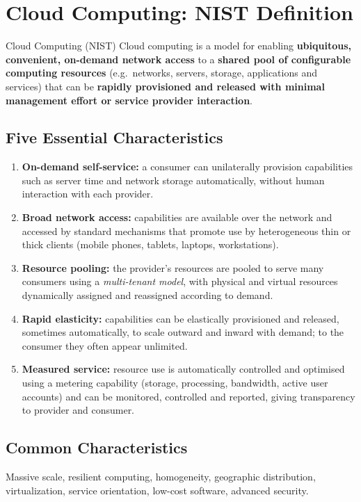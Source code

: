 \documentclass[11pt,a4paper,openany]{report}
\begin{document}
\section{Cloud Computing: NIST Definition}
\begin{defbox}{Cloud Computing (NIST)}
Cloud computing is a model for enabling \textbf{ubiquitous, convenient, on-demand network access}
to a \textbf{shared pool of configurable computing resources} (e.g.\ networks, servers, storage,
applications and services) that can be \textbf{rapidly provisioned and released with minimal
management effort or service provider interaction}.
\end{defbox}

\subsection{Five Essential Characteristics}
\begin{enumerate}[leftmargin=*]
  \item \textbf{On-demand self-service:} a consumer can unilaterally provision capabilities such
        as server time and network storage automatically, without human interaction with each
        provider.
  \item \textbf{Broad network access:} capabilities are available over the network and accessed
        by standard mechanisms that promote use by heterogeneous thin or thick clients (mobile
        phones, tablets, laptops, workstations).
  \item \textbf{Resource pooling:} the provider's resources are pooled to serve many consumers
        using a \emph{multi-tenant model}, with physical and virtual resources dynamically
        assigned and reassigned according to demand.
  \item \textbf{Rapid elasticity:} capabilities can be elastically provisioned and released,
        sometimes automatically, to scale outward and inward with demand; to the consumer they
        often appear unlimited.
  \item \textbf{Measured service:} resource use is automatically controlled and optimised using a
        metering capability (storage, processing, bandwidth, active user accounts) and can be
        monitored, controlled and reported, giving transparency to provider and consumer.
\end{enumerate}

\subsection{Common Characteristics}
Massive scale, resilient computing, homogeneity, geographic distribution, virtualization,
service orientation, low-cost software, advanced security.
\end{document}
